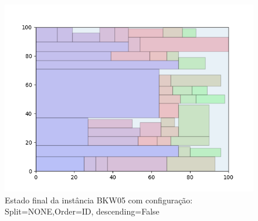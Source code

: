 \begin{figure}[H]
    \centering
    \caption[]{Estado final da instância BKW05 com configuração: Split=NONE,Order=ID, descending=False}
    \label{fig:bkw05-none-id-false}
    \includegraphics[scale=0.5]{output/figures/bkw/bkw05/none/id/false/00}
\end{figure}